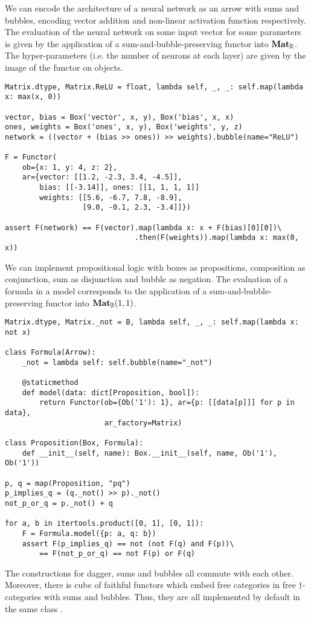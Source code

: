 \begin{example}
We can encode the architecture of a neural network as an arrow with sums and bubbles, encoding vector addition and non-linear activation function respectively.
The evaluation of the neural network on some input vector for some parameters is given by the application of a sum-and-bubble-preserving functor into $\mathbf{Mat}_{\mathbb{R}}$.
The hyper-parameters (i.e. the number of neurons at each layer) are given by the image of the functor on objects.

\begin{verbatim}
Matrix.dtype, Matrix.ReLU = float, lambda self, _, _: self.map(lambda x: max(x, 0))

vector, bias = Box('vector', x, y), Box('bias', x, x)
ones, weights = Box('ones', x, y), Box('weights', y, z)
network = ((vector + (bias >> ones)) >> weights).bubble(name="ReLU")

F = Functor(
    ob={x: 1, y: 4, z: 2},
    ar={vector: [[1.2, -2.3, 3.4, -4.5]],
        bias: [[-3.14]], ones: [[1, 1, 1, 1]]
        weights: [[5.6, -6.7, 7.8, -8.9],
                  [9.0, -0.1, 2.3, -3.4]]})

assert F(network) == F(vector).map(lambda x: x + F(bias)[0][0])\
                              .then(F(weights)).map(lambda x: max(0, x))
\end{verbatim}
\end{example}

\begin{example}
We can implement propositional logic with boxes as propositions, composition as conjunction, sum as disjunction and bubble as negation.
The evaluation of a formula in a model corresponds to the application of a sum-and-bubble-preserving functor into $\mathbf{Mat}_{\mathbb{B}}(1, 1)$.

\begin{verbatim}
Matrix.dtype, Matrix._not = B, lambda self, _, _: self.map(lambda x: not x)

class Formula(Arrow):
    _not = lambda self: self.bubble(name="_not")

    @staticmethod
    def model(data: dict[Proposition, bool]):
        return Functor(ob={Ob('1'): 1}, ar={p: [[data[p]]] for p in data},
                       ar_factory=Matrix)

class Proposition(Box, Formula):
    def __init__(self, name): Box.__init__(self, name, Ob('1'), Ob('1'))

p, q = map(Proposition, "pq")
p_implies_q = (q._not() >> p)._not()
not_p_or_q = p._not() + q

for a, b in itertools.product([0, 1], [0, 1]):
    F = Formula.model({p: a, q: b})
    assert F(p_implies_q) == not (not F(q) and F(p))\
        == F(not_p_or_q) == not F(p) or F(q)
\end{verbatim}
\end{example}

\begin{remark}
The constructions for dagger, sums and bubbles all commute with each other.
Moreover, there is cube of faithful functors which embed free categories in free $\dagger$-categories with sums and bubbles.
Thus, they are all implemented by default in the same class \py{Arrow}.
\end{remark}
